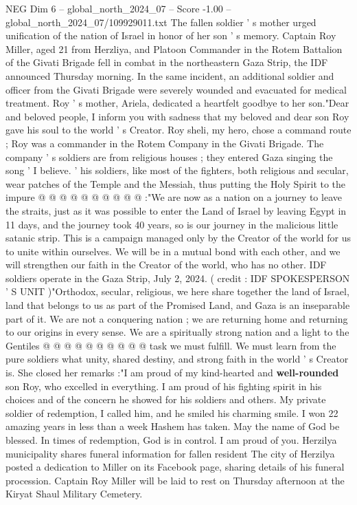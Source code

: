 \begin{textsample}{NEG Dim 6 – global\_north\_2024\_07 – Score -1.00 – global\_north\_2024\_07/109929011.txt}  \label{ex:f6_neg_137}
The fallen soldier ' s mother urged unification of the nation of Israel in honor of her son ' s memory.
Captain Roy Miller, aged 21 from Herzliya, and Platoon Commander in the Rotem Battalion of the Givati Brigade fell in combat in the northeastern Gaza Strip, the IDF announced Thursday morning.
In the same incident, an additional soldier and officer from the Givati Brigade were severely wounded and evacuated for medical treatment.
Roy ' s mother, Ariela, dedicated a heartfelt goodbye to her son."Dear and beloved people, I inform you with sadness that my beloved and dear son Roy gave his soul to the world ' s Creator.
Roy sheli, my hero, chose a command route ; Roy was a commander in the Rotem Company in the Givati Brigade.
The company ' s soldiers are from religious houses ; they entered Gaza singing the song ' I believe. ' his soldiers, like most of the fighters, both religious and secular, wear patches of the Temple and the Messiah, thus putting the Holy Spirit to the impure @ @ @ @ @ @ @ @ @ @ :"We are now as a nation on a journey to leave the straits, just as it was possible to enter the Land of Israel by leaving Egypt in 11 days, and the journey took 40 years, so is our journey in the malicious little satanic strip.
This is a campaign managed only by the Creator of the world for us to unite within ourselves.
We will be in a mutual bond with each other, and we will strengthen our faith in the Creator of the world, who has no other.
IDF soldiers operate in the Gaza Strip, July 2, 2024. ( credit : IDF SPOKESPERSON ' S UNIT )"Orthodox, secular, religious, we here share together the land of Israel, land that belongs to us as part of the Promised Land, and Gaza is an inseparable part of it.
We are not a conquering nation ; we are returning home and returning to our origins in every sense.
We are a spiritually strong nation and a light to the Gentiles @ @ @ @ @ @ @ @ @ @ task we must fulfill.
We must learn from the pure soldiers what unity, shared destiny, and strong faith in the world ' s Creator is.
She closed her remarks :"I am proud of my kind-hearted and \textbf{well-rounded} son Roy, who excelled in everything.
I am proud of his fighting spirit in his choices and of the concern he showed for his soldiers and others.
My private soldier of redemption, I called him, and he smiled his charming smile.
I won 22 amazing years in less than a week Hashem has taken.
May the name of God be blessed.
In times of redemption, God is in control.
I am proud of you.
Herzilya municipality shares funeral information for fallen resident The city of Herzilya posted a dedication to Miller on its Facebook page, sharing details of his funeral procession.
Captain Roy Miller will be laid to rest on Thursday afternoon at the Kiryat Shaul Military Cemetery.

\end{textsample}
